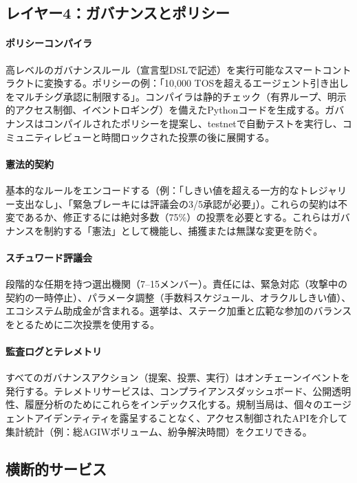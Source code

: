 \documentclass[11pt]{article}
\begin{document}
\subsection{レイヤー4：ガバナンスとポリシー}
\paragraph{ポリシーコンパイラ} 高レベルのガバナンスルール（宣言型DSLで記述）を実行可能なスマートコントラクトに変換する。ポリシーの例：「10,000 TOSを超えるエージェント引き出しをマルチシグ承認に制限する」。コンパイラは静的チェック（有界ループ、明示的アクセス制御、イベントロギング）を備えたPythonコードを生成する。ガバナンスはコンパイルされたポリシーを提案し、testnetで自動テストを実行し、コミュニティレビューと時間ロックされた投票の後に展開する。

\paragraph{憲法的契約} 基本的なルールをエンコードする（例：「しきい値を超える一方的なトレジャリー支出なし」、「緊急ブレーキには評議会の3/5承認が必要」）。これらの契約は不変であるか、修正するには絶対多数（75\%）の投票を必要とする。これらはガバナンスを制約する「憲法」として機能し、捕獲または無謀な変更を防ぐ。

\paragraph{スチュワード評議会} 段階的な任期を持つ選出機関（7--15メンバー）。責任には、緊急対応（攻撃中の契約の一時停止）、パラメータ調整（手数料スケジュール、オラクルしきい値）、エコシステム助成金が含まれる。選挙は、ステーク加重と広範な参加のバランスをとるために二次投票を使用する。

\paragraph{監査ログとテレメトリ} すべてのガバナンスアクション（提案、投票、実行）はオンチェーンイベントを発行する。テレメトリサービスは、コンプライアンスダッシュボード、公開透明性、履歴分析のためにこれらをインデックス化する。規制当局は、個々のエージェントアイデンティティを露呈することなく、アクセス制御されたAPIを介して集計統計（例：総AGIWボリューム、紛争解決時間）をクエリできる。

\subsection{横断的サービス}
\end{document}
